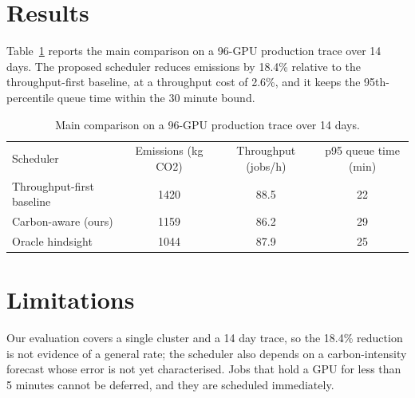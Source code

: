 \documentclass[11pt]{article}
\begin{document}
\section{Results}
Table~\ref{tab:main} reports the main comparison on a 96-GPU production trace
over 14 days. The proposed scheduler reduces emissions by 18.4\% relative to the
throughput-first baseline, at a throughput cost of 2.6\%, and it keeps the
95th-percentile queue time within the 30 minute bound.

\begin{table}
\caption{Main comparison on a 96-GPU production trace over 14 days.}
\label{tab:main}
\begin{tabular}{lccc}
Scheduler & Emissions (kg CO2) & Throughput (jobs/h) & p95 queue time (min) \\
Throughput-first baseline & 1420 & 88.5 & 22 \\
Carbon-aware (ours) & 1159 & 86.2 & 29 \\
Oracle hindsight & 1044 & 87.9 & 25 \\
\end{tabular}
\end{table}

\section{Limitations}
Our evaluation covers a single cluster and a 14 day trace, so the 18.4\%
reduction is not evidence of a general rate; the scheduler also depends on a
carbon-intensity forecast whose error is not yet characterised. Jobs that hold a
GPU for less than 5 minutes cannot be deferred, and they are scheduled
immediately.
\end{document}
